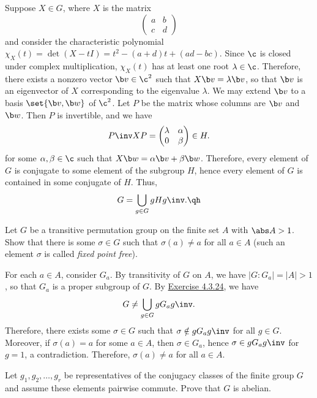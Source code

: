 \begin{sol}
	Suppose $X \in G$, where $X$ is the matrix
	\[
	\begin{pmatrix}
		a & b \\
		c & d
	\end{pmatrix}\]
	and consider the characteristic polynomial $\chi_X(t) = \det(X - tI) = t^2 - (a + d)t + (ad - bc)$. Since $\c$ is closed under complex multiplication, $\chi_X(t)$ has at least one root $\lambda \in \c$. Therefore, there exists a nonzero vector $\b v \in \c^2$ such that $X\b v = \lambda \b v$, so that $\b v$ is an eigenvector of $X$ corresponding to the eigenvalue $\lambda$. We may extend $\b v$ to a basis $\set{\b v, \b w}$ of $\c^2$. Let $P$ be the matrix whose columns are $\b v$ and $\b w$. Then $P$ is invertible, and we have
	\[P\inv XP = \begin{pmatrix}
		\lambda & \alpha \\
		0 & \beta
	\end{pmatrix} \in H.\]
	for some $\alpha, \beta \in \c$ such that $X\b w = \alpha \b v + \beta \b w$. Therefore, every element of $G$ is conjugate to some element of the subgroup $H$, hence every element of $G$ is contained in some conjugate of $H$. Thus,
	\[G = \bigcup_{g \in G} gHg\inv. \qh\]
\end{sol}

\begin{exercise}
	Let $G$ be a transitive permutation group on the finite set $A$ with $\abs A > 1$. Show that there is some $\sigma \in G$ such that $\sigma(a) \neq a$ for all $a \in A$ (such an element $\sigma$ is called \emph{fixed point free}).
\end{exercise}

\begin{sol}
	For each $a \in A$, consider $G_a$. By transitivity of $G$ on $A$, we have $|G : G_a| = |A| > 1$, so that $G_a$ is a proper subgroup of $G$. By \hyperref[ex4.3.24]{Exercise 4.3.24}, we have
	\[G \neq \bigcup_{g \in G} gG_ag\inv.\]
	Therefore, there exists some $\sigma \in G$ such that $\sigma \notin gG_ag\inv$ for all $g \in G$. Moreover, if $\sigma(a) = a$ for some $a \in A$, then $\sigma \in G_a$, hence $\sigma \in gG_ag\inv$ for $g = 1$, a contradiction. Therefore, $\sigma(a) \neq a$ for all $a \in A$.
\end{sol}

\begin{exercise}
	Let $g_1, g_2, \ldots, g_r$ be representatives of the conjugacy classes of the finite group $G$ and assume these elements pairwise commute. Prove that $G$ is abelian.
\end{exercise}

